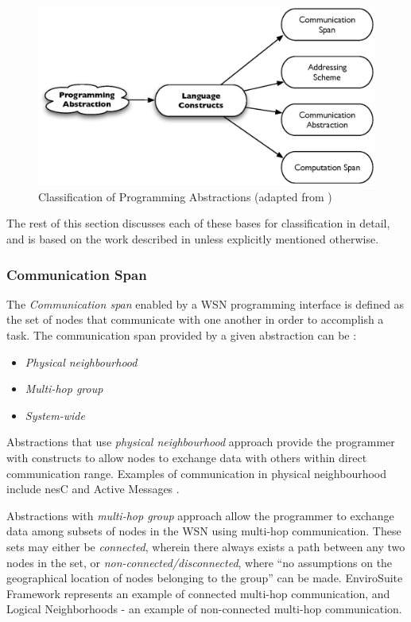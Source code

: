 \begin{figure}
\centering
\includegraphics[scale=0.65]{img/ProgAbstr_Classification.eps}
\caption{Classification of Programming Abstractions (adapted from \cite{mottola_middleware:2008})} 
\label{Fig:ProgrAbstrClassification}
\end{figure} 

The rest of this section discusses each of these bases for classification in
detail, and is based on the work described in \cite{mottola_middleware:2008}
unless explicitly mentioned otherwise.

\subsubsection{Communication Span}

The \emph{Communication span} enabled by a WSN programming interface is defined
as the set of nodes that communicate with one another in order to accomplish a
task. The communication span provided by a given abstraction can be
\cite{mottola_middleware:2008}:
\begin{itemize}
  \item \emph{Physical neighbourhood}
  \item \emph{Multi-hop group}
  \item \emph{System-wide}
\end{itemize}

Abstractions that use \emph{physical neighbourhood} approach provide
  the programmer with constructs to allow nodes to exchange data with others
  within direct communication range. Examples of communication in physical
  neighbourhood include nesC \cite{nesc:2003} and Active Messages \cite{activemessagesEicken:2001}.
  
Abstractions with \emph{multi-hop group} approach allow the
  programmer to exchange data among subsets of nodes in the WSN using
  multi-hop communication. These sets may either be
  \emph{connected}, wherein there always exists a path between any two nodes in
  the set, or \emph{non-connected/disconnected}, where ``no assumptions on the geographical location of nodes 
belonging to the group'' \cite{mottola_middleware:2008} can be made.  
  EnviroSuite Framework \cite{envirosuite:2006} represents an example of
  connected multi-hop communication, and Logical Neighborhoods
  \cite{mottola_LN:2006} - an example of non-connected multi-hop
  communication.

